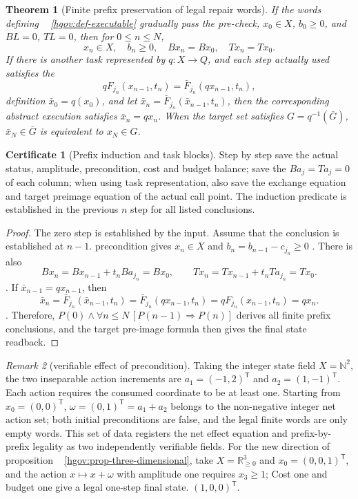 \documentclass[12pt,a4paper,openany,notitlepage]{report}
\theoremstyle{plain}
\newtheorem{theorem}{Theorem}[chapter]
\theoremstyle{definition}
\newtheorem*{certificate}{Certificate}
\theoremstyle{remark}
\newtheorem{remark}[theorem]{Remark}
\begin{document}
\begin{CJK*}
\begin{theorem}
[Finite prefix preservation of legal repair words]\label{hgov:thm-execution}
If the words defining ~ \ref{hgov:def-executable} gradually pass the pre-check, $x_0\in X$, $b_0\ge0$, and $BL=0$, $TL=0$, then for $0\le n\le N$, \[
 x_n\in X,\quad b_n\ge0,\quad
 Bx_n=Bx_0,\quad Tx_n=Tx_0.
\] If there is another task represented by $q:X\to Q$, and each step actually used satisfies the \[
 qF_{j_n}(x_{n-1},t_n)
 =\bar F_{j_n}(qx_{n-1},t_n),
\] definition $\bar x_0=q(x_0)$, and let $\bar x_n=\bar F_{j_n}(\bar x_{n-1},t_n)$, then the corresponding abstract execution satisfies $\bar x_n=qx_n$. When the target set satisfies $G=q^{-1}(\bar G)$, $\bar x_N\in\bar G$ is equivalent to $x_N\in G$.\end{theorem}
\begin{certificate}
[Prefix induction and task blocks]Step by step save the actual status, amplitude, precondition, cost and budget balance; save the $Ba_j=Ta_j=0$ of each column; when using task representation, also save the exchange equation and target preimage equation of the actual call point. The induction predicate is established in the previous $n$ step for all listed conclusions.\end{certificate}
\begin{proof}
The zero step is established by the input. Assume that the conclusion is established at $n-1$. precondition gives $x_n\in X$ and $b_n=b_{n-1}-c_{j_n}\ge0$ . There is also \[
 Bx_n=Bx_{n-1}+t_nBa_{j_n}=Bx_0,\qquad
 Tx_n=Tx_{n-1}+t_nTa_{j_n}=Tx_0.
\]. If $\bar x_{n-1}=qx_{n-1}$, then \[
 \bar x_n=\bar F_{j_n}(\bar x_{n-1},t_n)
 =\bar F_{j_n}(qx_{n-1},t_n)
 =qF_{j_n}(x_{n-1},t_n)=qx_n.
\]. Therefore, $P(0)\wedge\forall n\le N\,[P(n-1)\Rightarrow P(n)]$ derives all finite prefix conclusions, and the target pre-image formula then gives the final state readback.\end{proof}


\begin{remark}
[verifiable effect of precondition]\label{hgov:rem-preconditions}
Taking the integer state field $X=\mathbb N^2$, the two inseparable action increments are $a_1=(-1,2)^{\mathsf T}$ and $a_2=(1,-1)^{\mathsf T}$. Each action requires the consumed coordinate to be at least one. Starting from $x_0=(0,0)^{\mathsf T}$, $\omega=(0,1)^{\mathsf T}=a_1+a_2$ belongs to the non-negative integer net action set; both initial preconditions are false, and the legal finite words are only empty words. This set of data registers the net effect equation and prefix-by-prefix legality as two independently verifiable fields. For the new direction of proposition ~ \ref{hgov:prop-three-dimensional}, take $X=\mathbb R_{\ge0}^3$ and $x_0=(0,0,1)^{\mathsf T}$, and the action $x\mapsto x+\omega$ with amplitude one requires $x_3\ge1$; Cost one and budget one give a legal one-step final state. $(1,0,0)^{\mathsf T}$.\end{remark}



\end{CJK*}
\end{document}
